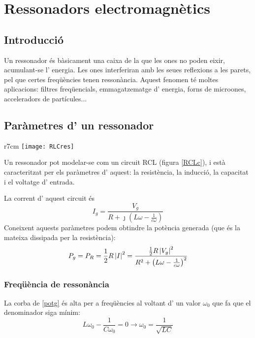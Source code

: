 \chapter{Ressonadors electromagnètics}

\section{Introducció}

Un ressonador és bàsicament una caixa de la que les ones no poden eixir, acumulant-se l' energia. Les ones interferiran amb les seues reflexions a les parets, pel que certes freqüències tenen ressonància. Aquest fenomen té moltes aplicacions: filtres freqüencials, emmagatzematge d' energia, forns de microones, acceleradors de partícules...

\section{Paràmetres d' un ressonador}

\begin{wrapfigure}{r}{7cm}
  \texttt{[image: RLCres]}
  \caption{Circuit RCL equivalent}
  \label{RCLc}
\end{wrapfigure}

Un ressonador pot modelar-se com un circuit RCL (figura \cref{RCLc}), i està caracteritzat per els paràmetres d' aquest: la resistència, la inducció, la capacitat i el voltatge d' entrada.

La corrent d' aquest circuit és
\begin{equation}
  I_g = \frac{V_g}{R + \jmath \left (L \omega - \frac{1}{c\omega} \right)}
\end{equation}
Coneixent aquests paràmetres podem obtindre la potència generada (que és la mateixa dissipada per la resistència):
\begin{equation}
  P_g = P_R = \frac{1}{2}R \left\rvert I \right\lvert ^2 = \frac{\frac{1}{2} R \left\rvert  V_g \right\lvert ^2}{R^2 + \left(L \omega - \frac{1}{c\omega} \right)^2}
  \label{potg}
\end{equation}

\subsection{Freqüència de ressonància}

La corba de \cref{potg} és alta per a freqüències al voltant d' un valor $\omega _0$ que fa que el denominador siga mínim:
\begin{equation}
L \omega_0 - \frac{1}{C\omega _0} = 0 \to \omega _0 = \frac{1}{\sqrt{LC}}
\end{equation}


